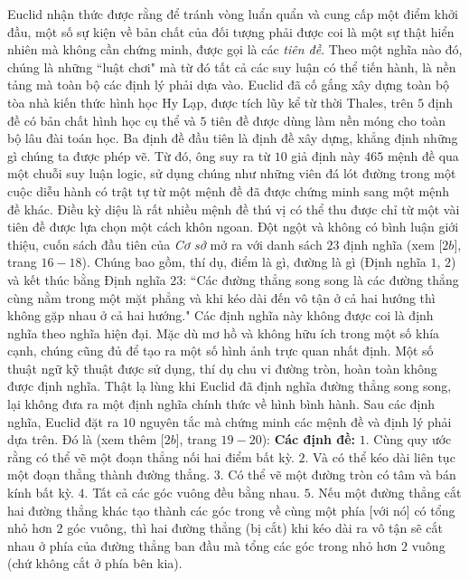 \begin{multicols}{2}
	\vskip 0.1cm 
	Euclid nhận thức được rằng để tránh vòng luẩn quẩn và cung cấp một điểm khởi đầu, một số sự kiện về bản chất của đối tượng phải được coi là một sự thật hiển nhiên mà không cần chứng minh, được gọi là các \textit{tiên đề}. Theo một nghĩa nào đó, chúng là những ``luật chơi" mà từ đó tất cả các suy luận có thể tiến hành, là nền tảng mà toàn bộ các định lý phải dựa vào.
	\vskip 0.1cm
	Euclid đã cố gắng xây dựng toàn bộ tòa nhà kiến thức hình học Hy Lạp, được tích lũy kể từ thời Thales, trên $5$ định đề có bản chất hình học cụ thể và $5$ tiên đề được dùng làm nền móng cho toàn bộ lâu đài toán học. Ba định đề đầu tiên là định đề xây dựng, khẳng định những gì chúng ta được phép vẽ. Từ đó, ông suy ra từ $10$ giả định này $465$ mệnh đề qua một chuỗi suy luận logic, sử dụng chúng như những viên đá lót đường trong một cuộc diễu hành có trật tự từ một mệnh đề đã được chứng minh sang một mệnh đề khác. Điều kỳ diệu là rất nhiều mệnh đề thú vị có thể thu được chỉ từ một vài tiên đề được lựa chọn một cách  khôn ngoan. 
	\vskip 0.1cm
	Đột ngột và không có bình luận giới thiệu, cuốn sách đầu tiên của \textit{Cơ sở} mở ra với danh sách $23$ định nghĩa (xem [$2b$], trang $16-18$). Chúng bao gồm, thí dụ, điểm là gì, đường là gì (Định nghĩa $1$, $2$) và kết thúc bằng Định nghĩa $23$: ``Các đường thẳng song song là các đường thẳng cùng nằm trong một mặt phẳng và khi kéo dài đến vô tận ở cả hai hướng thì không gặp nhau ở cả hai hướng." Các định nghĩa này không được coi là định nghĩa theo nghĩa hiện đại. Mặc dù mơ hồ và không hữu ích trong một số khía cạnh, chúng cũng đủ để tạo ra một số hình ảnh trực quan nhất định. Một số thuật ngữ kỹ thuật được sử dụng, thí dụ chu vi đường tròn, hoàn toàn không được định nghĩa. Thật lạ lùng khi Euclid đã định nghĩa đường thẳng song song, lại không đưa ra một định nghĩa chính thức về hình bình hành.
	\vskip 0.1cm
	Sau các định nghĩa, Euclid đặt ra $10$ nguyên tắc mà chứng minh các mệnh đề và định lý phải dựa trên. Đó là (xem thêm [$2b$], trang $19-20$):
	\vskip 0.1cm
	\textbf{\color{lichsutoanhoc}Các định đề:}
	\vskip 0.1cm
	$1.$ Cùng quy ước rằng có thể vẽ một đoạn thẳng nối hai điểm bất kỳ.
	\vskip 0.1cm
	$2.$ Và có thể kéo dài liên tục một đoạn thẳng thành đường thẳng.
	\vskip 0.1cm
	$3.$ Có thể vẽ một đường tròn có tâm và bán kính bất kỳ.
	\vskip 0.1cm
	$4.$ Tất cả các góc vuông đều bằng nhau.
	\vskip 0.1cm
	$5.$ Nếu một đường thẳng cắt hai đường thẳng khác tạo thành các góc trong về cùng một phía [với nó] có tổng nhỏ hơn $2$ góc vuông, thì hai đường thẳng (bị cắt) khi kéo dài ra vô tận sẽ cắt nhau ở phía của đường thẳng ban đầu mà tổng các góc trong nhỏ hơn $2$ vuông (chứ không cắt ở phía bên kia). 

\end{multicols}
